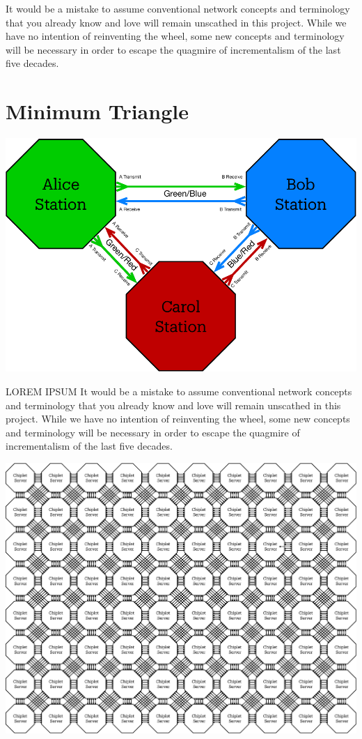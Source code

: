  It would be a mistake to assume conventional network concepts and terminology that you already know and love will remain unscathed in this project. While we have no intention of reinventing the wheel,  some new concepts and terminology will be necessary in order to escape the quagmire of incrementalism of the last five decades.  


 \section{Minimum Triangle}
 
 \begin{marginfigure}
  \includegraphics[width=1.2\linewidth]{../../FIGURES/Minimum-Triangle.pdf}
      \vspace{2em}
\end{marginfigure}

LOREM IPSUM It would be a mistake to assume conventional network concepts and terminology that you already know and love will remain unscathed in this project. While we have no intention of reinventing the wheel,  some new concepts and terminology will be necessary in order to escape the quagmire of incrementalism of the last five decades.  


 \begin{marginfigure}
  \includegraphics[width=1.2\linewidth]{../../FIGURES/8x10-Chiplets.pdf}
      \vspace{2em}
\end{marginfigure}

